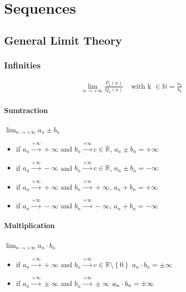 \documentclass[a4paper]{report}
\begin{document}
\chapter{\textbf{Sequences}}
\section{\textbf{General Limit Theory}}
\subsection{\textbf{Infinities}}
\begin{align}
\lim_{n \to +\infty} \frac{P_{k}\left ( n \right )}{Q_{k}\left ( n \right )} & \text{ with k } \in \mathbb{N} = \frac{a_{k}}{b_{k}}
\end{align}
\subsubsection{\textbf{Sumtraction}}
 $\lim_{n \to +\infty}    a_{n} \pm  b_{n}$ \text{:}
\begin{itemize}
\item if  $a_{n}\overset{+\infty }{\rightarrow} +\infty$ and $b_{n}\overset{+\infty }{\rightarrow} c\in\mathbb{R}$,    $a_{n} \pm  b_{n} = +\infty$
\item if  $a_{n}\overset{+\infty }{\rightarrow} -\infty$ and $b_{n}\overset{+\infty }{\rightarrow} c\in\mathbb{R}$,    $a_{n} \pm  b_{n} = -\infty$
\item if  $a_{n}\overset{+\infty }{\rightarrow} +\infty$ and $b_{n}\overset{+\infty }{\rightarrow} +\infty$,    $a_{n} +  b_{n} = +\infty$
\item if  $a_{n}\overset{+\infty }{\rightarrow} -\infty$ and $b_{n}\overset{+\infty }{\rightarrow} -\infty$,    $a_{n} +  b_{n} = -\infty$
\end{itemize}
\subsubsection{\textbf{Multiplication}}
 $\lim_{n \to + \infty} a_{n} \cdot b_{n}$ \text{ :}
\begin{itemize}
    \item if $a_{n}\overset{+\infty }{\rightarrow} +\infty$ and $ b_{n}\overset{+\infty }{\rightarrow} c\in\mathbb{R}\setminus \left \{ 0 \right \} $  $ a_{n} \cdot b_{n} = \pm \infty$
    \item if $a_{n}\overset{+\infty }{\rightarrow} \pm \infty$ and $b_{n}\overset{+\infty }{\rightarrow} \pm \infty$  $ a_{n} \cdot b_{n} = \pm \infty\\$ 
\end{itemize}
\end{document}
